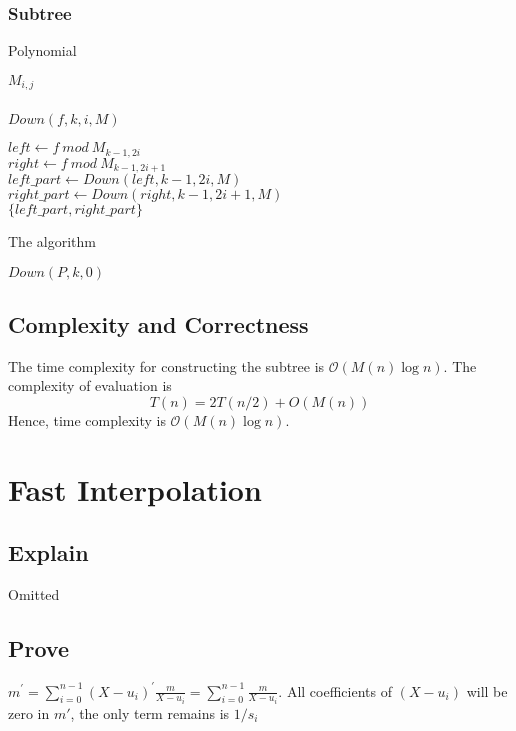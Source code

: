 \documentclass[12pt,a4paper]{article}
\theoremstyle{definition}
\begin{document}
  \subsubsection{Subtree}
    \begin{algorithm*}[H]
      \caption{Polynomial}
      \Return $M_{i,j}$
    \end{algorithm*}
  \subsubsection{}
  \begin{algorithm*}[H]
    \caption{$Down(f,k,i,M)$}
      $left \gets f\ mod\ M_{k-1,2i}$ \\ 
      $right \gets f\ mod\ M_{k-1,2i+1}$ \\ 
      $left\_part \gets Down(left,k-1,2i,M)$ \\ 
      $right\_part \gets Down(right,k-1,2i+1,M)$ \\ 
      \Return $\{left\_part,right\_part\}$
  \end{algorithm*}
  \begin{algorithm*}[H]
    \caption{The algorithm}
    \Return $Down(P,k,0)$
  \end{algorithm*}
\subsection{Complexity and Correctness}
The time complexity for constructing the subtree is $\mathcal{O}(M(n)\log n)$. The complexity of evaluation is 
$$
  T(n)= 2 T(n/2) + O(M(n))
$$
Hence, time complexity is $\mathcal{O}(M(n)\log n)$.
\section*{Fast Interpolation}
\subsection{Explain}
Omitted
\subsection{Prove}
$m^{'} = \sum_{i=0}^{n-1}(X-u_i)^{'} \frac{m}{X-u_i} = \sum_{i=0}^{n-1}\frac{m}{X-u_i}$. All coefficients of $(X-u_i)$ will be zero in $m'$, the only term remains is $1/s_i$ 
\end{document}
